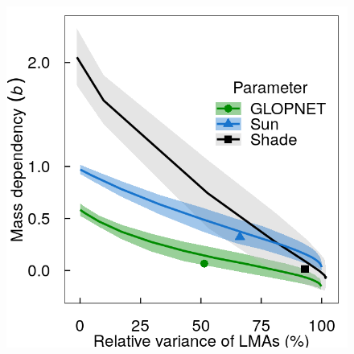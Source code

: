 \documentclass[
  12pt,
  a4paper,
,tablecaptionabove
]{scrartcl}
\providecommand{\DIFaddbeginFL}{} %
\providecommand{\DIFdelbeginFL}{} %
\providecommand{\DIFdelendFL}{} %
\newcommand{\DIFscaledelfig}{0.5}
\newlength{\DIFdelgraphicswidth} %
\newlength{\DIFdelgraphicsheight} %
\newcommand{\DIFaddincludegraphics}[2][]{{\color{blue}\fbox{\DIFOincludegraphics[#1]{#2}}}} %
\newcommand{\DIFdelincludegraphics}[2][]{%
\sbox{\DIFdelgraphicsbox}{\DIFOincludegraphics[#1]{#2}}%
\settoboxwidth{\DIFdelgraphicswidth}{\DIFdelgraphicsbox} %
\settoboxtotalheight{\DIFdelgraphicsheight}{\DIFdelgraphicsbox} %
\scalebox{\DIFscaledelfig}{%
\parbox[b]{\DIFdelgraphicswidth}{\usebox{\DIFdelgraphicsbox}\\[-\baselineskip] \rule{\DIFdelgraphicswidth}{0em}}\llap{\resizebox{\DIFdelgraphicswidth}{\DIFdelgraphicsheight}{%
\setlength{\unitlength}{\DIFdelgraphicswidth}%
\begin{picture}(1,1)%
\thicklines\linethickness{2pt} %
{\color[rgb]{1,0,0}\put(0,0){\framebox(1,1){}}}%
{\color[rgb]{1,0,0}\put(0,0){\line( 1,1){1}}}%
{\color[rgb]{1,0,0}\put(0,1){\line(1,-1){1}}}%
\end{picture}%
}\hspace*{3pt}}} %
} %
\DeclareRobustCommand{\DIFaddbeginFL}{\DIFOaddbeginFL \let\includegraphics\DIFaddincludegraphics} %
\DeclareRobustCommand{\DIFdelbeginFL}{\DIFOdelbeginFL \let\includegraphics\DIFdelincludegraphics} %
\DeclareRobustCommand{\DIFdelendFL}{\DIFOaddendFL \let\includegraphics\DIFOincludegraphics} %
\begin{document}
\begin{figure}
\DIFdelbeginFL %
\DIFdelendFL \DIFaddbeginFL

{\centering \includegraphics{../figs/mass_prop_mv.png}

}


\end{figure}
\end{document}
